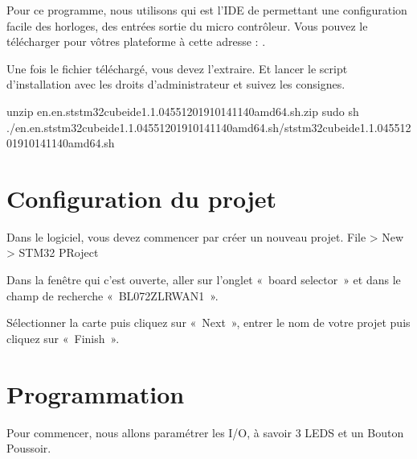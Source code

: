\documentclass[letterpaper,10pt,french]{sphinxmanual}
\begin{document}
Pour ce programme, nous utilisons  qui est l’IDE de  permettant une configuration facile des horloges, des entrées sortie du micro contrôleur.
Vous pouvez le télécharger pour vôtres plateforme à cette adresse : .

Une fois le fichier téléchargé, vous devez l’extraire. Et lancer le script d’installation avec les droits d’administrateur et suivez les consignes.

\begin{sphinxVerbatim}[commandchars=\\\{\}]
unzip en.en.st\PYGZhy{}stm32cubeide\PYGZus{}1.1.0\PYGZus{}4551\PYGZus{}20191014\PYGZus{}1140\PYGZus{}amd64.sh.zip
sudo sh ./en.en.st\PYGZhy{}stm32cubeide\PYGZus{}1.1.0\PYGZus{}4551\PYGZus{}20191014\PYGZus{}1140\PYGZus{}amd64.sh/st\PYGZhy{}stm32cubeide\PYGZus{}1.1.0\PYGZus{}4551\PYGZus{}20191014\PYGZus{}1140\PYGZus{}amd64.sh
\end{sphinxVerbatim}


\section{Configuration du projet}
\label{\detokenize{creationPrgpourFctdeSEc:configuration-du-projet}}
Dans le logiciel, vous devez commencer par créer un nouveau projet.
File \sphinxhyphen{}\textgreater{} New \sphinxhyphen{}\textgreater{} STM32 PRoject


Dans la fenêtre qui c’est ouverte, aller sur l’onglet « board selector » et dans le champ de recherche « B\sphinxhyphen{}L072Z\sphinxhyphen{}LRWAN1 ».


Sélectionner la carte puis cliquez sur « Next », entrer le nom de votre projet puis cliquez sur « Finish ».



\section{Programmation}
\label{\detokenize{creationPrgpourFctdeSEc:programmation}}
Pour commencer, nous allons paramétrer les I/O, à savoir 3 LEDS et un Bouton Poussoir.
\end{document}
